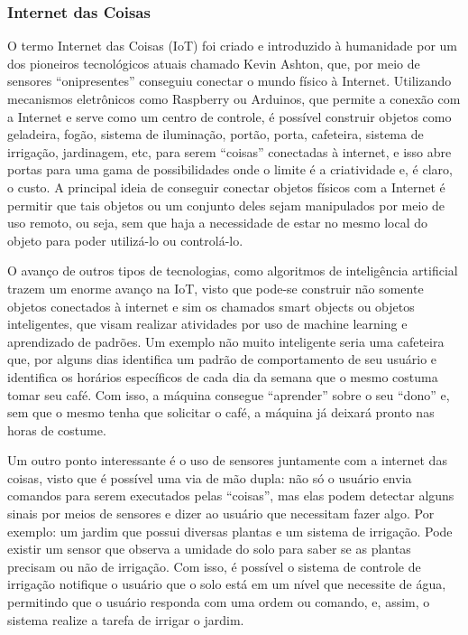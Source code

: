             \subsubsection{Internet das Coisas}
                \par O termo Internet das Coisas (IoT) foi criado e introduzido à humanidade por um dos pioneiros tecnológicos atuais chamado Kevin Ashton, que, por meio de sensores “onipresentes” conseguiu conectar o mundo físico à Internet. Utilizando mecanismos eletrônicos como Raspberry ou Arduinos, que permite a conexão com a Internet e serve como um centro de controle, é possível construir objetos como geladeira, fogão, sistema de iluminação, portão, porta, cafeteira, sistema de irrigação, jardinagem, etc, para serem “coisas” conectadas à internet, e isso abre portas para uma gama de possibilidades onde o limite é a criatividade e, é claro, o custo. A principal ideia de conseguir conectar objetos físicos com a Internet é permitir que tais objetos ou um conjunto deles sejam manipulados por meio de uso remoto, ou seja, sem que haja a necessidade de estar no mesmo local do objeto para poder utilizá-lo ou controlá-lo.
                \par O avanço de outros tipos de tecnologias, como algoritmos de inteligência artificial trazem um enorme avanço na IoT, visto que pode-se construir não somente objetos conectados à internet e sim os chamados smart objects ou objetos inteligentes, que visam realizar atividades por uso de machine learning e aprendizado de padrões. Um exemplo não muito inteligente seria uma cafeteira que, por alguns dias identifica um padrão de comportamento de seu usuário e identifica os horários específicos de cada dia da semana que o mesmo costuma tomar seu café. Com isso, a máquina consegue “aprender” sobre o seu “dono” e, sem que o mesmo tenha que solicitar o café, a máquina já deixará pronto nas horas de costume.
                \par Um outro ponto interessante é o uso de sensores juntamente com a internet das coisas, visto que é possível uma via de mão dupla: não só o usuário envia comandos para serem executados pelas “coisas”, mas elas podem detectar alguns sinais por meios de sensores e dizer ao usuário que necessitam fazer algo. Por exemplo: um jardim que possui diversas plantas e um sistema de irrigação. Pode existir um sensor que observa a umidade do solo para saber se as plantas precisam ou não de irrigação. Com isso, é possível o sistema de controle de irrigação notifique o usuário que o solo está em um nível que necessite de água, permitindo que o usuário responda com uma ordem ou comando, e, assim, o sistema realize a tarefa de irrigar o jardim.
        
